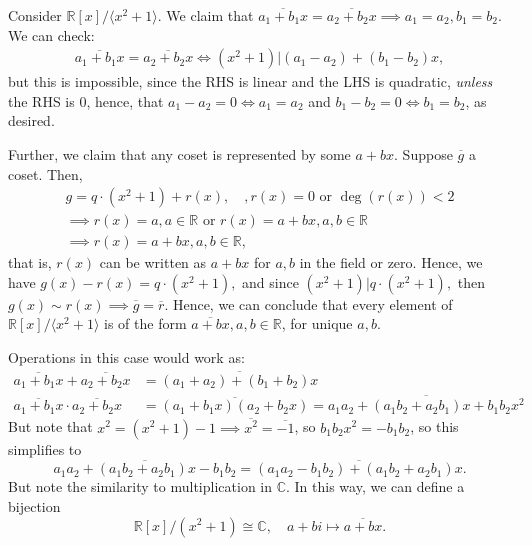 \documentclass[12pt,oneside]{article}
\begin{document}
\begin{example}
  Consider $\mathbb{R}[x]/\langle x^2 + 1\rangle$. We claim that $\overline{a_1 + b_1 x} = \overline{a_2 + b_2 x} \implies a_1 = a_2, b_1 = b_2$. We can check:
  \begin{align*}
    \overline{a_1 + b_1 x} = \overline{a_2 + b_2 x} \iff (x^2 + 1) | (a_1 - a_2) + (b_1 - b_2)x,
  \end{align*}
  but this is impossible, since the RHS is linear and the LHS is quadratic, \emph{unless} the RHS is $0$, hence, that $a_1 - a_2 = 0 \iff a_1 = a_2$ and $b_1 - b_2 = 0 \iff b_1 = b_2$, as desired.

  Further, we claim that any coset is represented by some $a+bx$. Suppose $\overline{g}$ a coset. Then,
  \begin{align*}
    g = q \cdot (x^2 + 1) + r(x), \quad, r(x) = 0 \text{ or } \deg (r(x)) < 2\\
    \implies r(x) = a, a \in \mathbb{R} \text{ or } r(x) = a + bx, a, b \in \mathbb{R}\\
    \implies r(x) = a+bx, a, b \in \mathbb{R},
  \end{align*}
  that is, $r(x)$ can be written as $a +bx$ for $a,b$ in the field or zero. Hence, we have $g(x) - r(x) = q \cdot (x^2 +1),$ and since $(x^2 + 1 )| q \cdot (x^2 + 1),$ then $g(x) \sim r(x) \implies \overline{g} = \overline{r}$. Hence, we can conclude that every element of $\mathbb{R}[x]/\langle x^2 + 1 \rangle$ is of the form $\overline{a + bx}, a, b \in \mathbb{R}$, for unique $a,b$.

  Operations in this case would work as:
  \begin{align*}
    \overline{a_1 + b_1 x} + \overline{a_2 + b_2 x} &= \overline{(a_1 + a_2) + (b_1 + b_2)x}\\
    \overline{a_1 + b_1 x} \cdot \overline{a_2 + b_2 x} &= \overline{(a_1 + b_1x)(a_2 + b_2 x)} = \overline{a_1a_2 + (a_1 b_2 + a_2 b_1)x + b_1 b_2 x^2}
  \end{align*}
  But note that $x^2 = (x^2+1)-1 \implies \overline{x^2} = \overline{-1}$, so $b_1 b_2 x^2 = - b_1 b_2$, so this simplifies to \[
    \overline{a_1a_2 + (a_1 b_2 + a_2 b_1)x - b_1b_2} = \overline{(a_1a_2- b_1b_2) + (a_1 b_2 + a_2 b_1)x }.
  \]
  But note the similarity to multiplication in $\mathbb{C}$. In this way, we can define a bijection\footnotemark\[\mathbb{R}[x]/(x^2+1) \cong \mathbb{C}, \quad a + bi \mapsto \overline{a+bx}.\]
\end{example}
\end{document}
